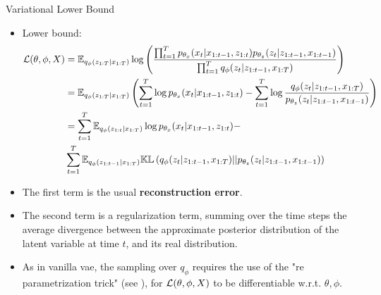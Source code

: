 \begin{frame}{Variational Lower Bound}
    \begin{itemize}
        \item Lower bound:
        \begin{align}
            \mathcal{L}(\theta, \phi, X) &= \mathbb{E}_{q_{\phi}(z_{1:T}\vert x_{1:T})} \log{\left( \frac{\prod_{t=1}^T p_{\theta_x}(x_t \vert x_{1:t-1}, z_{1:t}) p_{\theta_z}(z_t \vert z_{1:t-1}, x_{1:t-1})}{\prod_{t=1}^T q_\phi (z_t \vert z_{1:t-1}, x_{1:T})} \right)} \\
            &= \mathbb{E}_{q_{\phi}(z_{1:T}\vert x_{1:T})} \left(  \sum_{t=1}^T \log{p_{\theta_x}(x_t \vert x_{1:t-1}, z_{1:t})} - \sum_{t=1}^T \log{\frac{q_\phi (z_t \vert z_{1:t-1}, x_{1:T})}{p_{\theta_z}(z_t \vert z_{1:t-1}, x_{1:t-1})}}
            \right) \\
            &= \sum_{t=1}^T \mathbb{E}_{q_\phi(z_{1:t} \vert x_{1:T})} \log{p_{\theta_x}(x_t \vert x_{1:t-1}, z_{1:t})} -\\
            &\sum_{t=1}^T \mathbb{E}_{q_\phi(z_{1:t-1} \vert x_{1:T})} \mathbb{KL}\left( q_\phi(z_t \vert z_{1:t-1}, x_{1:T}) \vert\vert p_{\theta_z}(z_t \vert z_{1:t-1}, x_{1:t-1}) \right)
        \end{align}
        \item The first term is the usual \textbf{reconstruction error}.
        \item The second term is a regularization term, summing over the time steps the average divergence between the approximate posterior distribution of the latent variable at time $t$, and its real distribution.
        \item As in vanilla \gls{vae}, the sampling over $q_\phi$ requires the use of the "re parametrization trick" (see \cite{kingma_introduction_2019}), for $\mathcal{L}(\theta, \phi, X)$ to be differentiable w.r.t. $\theta, \phi$.
    \end{itemize}
\end{frame}

